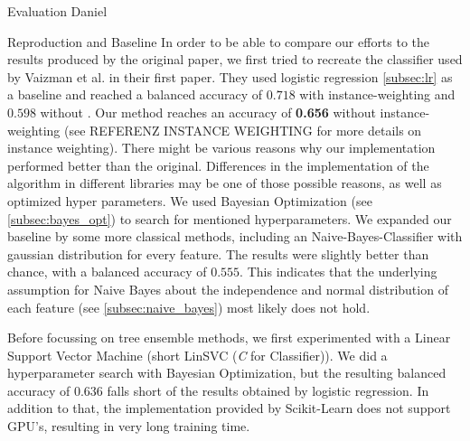 \begin{section}{Evaluation Daniel}
	\begin{subsection}{Reproduction and Baseline}
		In order to be able to compare our efforts to the results produced by the original paper, we first tried to recreate the classifier used by Vaizman et al. in their first paper. They used logistic regression \ref{subsec:lr} as a baseline and reached a balanced accuracy of $0.718$ with instance-weighting and $0.598$ without \cite{Vaizman18}. Our method reaches an accuracy of \textbf{0.656} without instance-weighting (see REFERENZ INSTANCE WEIGHTING for more details on instance weighting). There might be various reasons why our implementation performed better than the original. Differences in the implementation of the algorithm in different libraries may be one of those possible reasons, as well as optimized hyper parameters. We used Bayesian Optimization (see \ref{subsec:bayes_opt}) to search for mentioned hyperparameters. 
		We expanded our baseline by some more classical methods, including an Naive-Bayes-Classifier with gaussian distribution for every feature. The results were slightly better than chance, with a balanced accuracy of $0.555$. This indicates that the underlying assumption for Naive Bayes about the independence and normal distribution of each feature (see \ref{subsec:naive_bayes}) most likely does not hold. \par
		Before focussing on tree ensemble methods, we first experimented with a Linear Support Vector Machine (short LinSVC (\emph{C} for Classifier)). We did a hyperparameter search with Bayesian Optimization, but the resulting balanced accuracy of $0.636$ falls short of the results obtained by logistic regression. In addition to that, the implementation provided by Scikit-Learn does not support GPU's, resulting in very long training time. \par
	\end{subsection}


\end{section}

